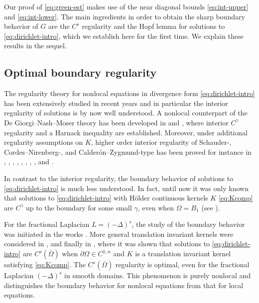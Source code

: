 \documentclass[11pt,reqno]{amsart}
\theoremstyle{plain}
\theoremstyle{definition}
\numberwithin{equation}{section}
\newcommand{\1}{\mathbbm{1}}
\begin{document}
Our proof of \eqref{eq:green-est} makes use of the near diagonal bounds \eqref{eq:int-upper} and \eqref{eq:int-lower}. The main ingredients in order to obtain the sharp boundary behavior of $G$ are the $C^s$ regularity and the Hopf lemma for solutions to \eqref{eq:dirichlet-intro}, which we establish here for the first time. We explain these results in the sequel. 


\subsection{Optimal boundary regularity}

The regularity theory for nonlocal equations in divergence form \eqref{eq:dirichlet-intro} has been extensively studied in recent years and in particular the interior regularity of solutions is by now well understood. A nonlocal counterpart of the De Giorgi--Nash--Moser theory has been developed in \cite{BaLe02,Kas09,DyKa20,KaWe24} and \cite{DKP14,DKP16,Coz17}, where interior $C^{\gamma}$ regularity and a Harnack inequality are established.
Moreover, under additional regularity assumptions on $K$, higher order interior regularity of Schauder-, Cordes--Nirenberg-, and Calder\'on--Zygmund-type has been proved for instance in \cite{Coz17b}, \cite{Brli17,BLS18}, \cite{Now20,Now21,Now23}, \cite{Fal20}, \cite{MSY21,FMSY22}, \cite{FeRo24b}, \cite{KNS22}, \cite{DiNo25}, and \cite{Loh23}.

In contrast to the interior regularity, the boundary behavior of solutions to \eqref{eq:dirichlet-intro} is much less understood. In fact, until now it was only known that solutions to \eqref{eq:dirichlet-intro} with H\"older continuous kernels $K$ \eqref{eq:Kcomp} are $C^{\gamma}$ up to the boundary for some small $\gamma$, even when $\Omega = B_1$ (see \cite{KKP16, KiLe23}).

For the fractional Laplacian $L = (-\Delta)^s$, the study of the boundary behavior was initiated in the works \cite{ChSo98,CKS10,RoSe14}. More general translation invariant kernels were considered in \cite{Gru15,RoSe16,RoSe16b,RoSe17,AbRo20}, and finally in \cite{RoWe24},  where it was shown that solutions to \eqref{eq:dirichlet-intro} are $C^s(\overline{\Omega})$ when $\partial \Omega \in C^{1,\alpha}$ and $K$ is a translation invariant kernel satisfying \eqref{eq:Kcomp}. The $C^s(\overline{\Omega})$ regularity is optimal, even for the fractional Laplacian $(-\Delta)^s$ in smooth domains. This phenomenon is purely nonlocal and distinguishes the boundary behavior for nonlocal equations from that for local equations.
\end{document}
